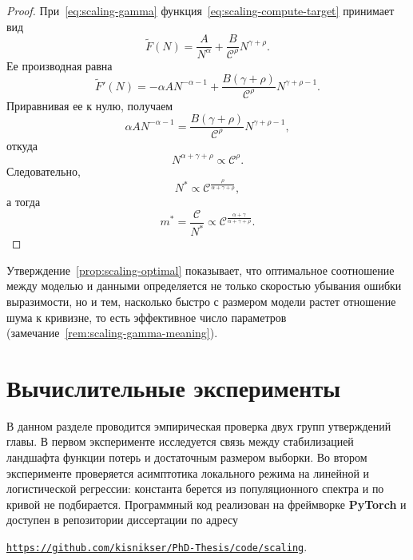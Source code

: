 \begin{proof}
    При~\eqref{eq:scaling-gamma} функция~\eqref{eq:scaling-compute-target} принимает вид
    \begin{equation}
        \widetilde F(N)
        =
        \frac{A}{N^{\alpha}}
        +
        \frac{B}{\mathcal C^{\rho}}N^{\gamma+\rho}.
    \end{equation}
    Ее производная равна
    \begin{equation}
        \widetilde F'(N)
        =
        -\alpha A N^{-\alpha-1}
        +
        \frac{B(\gamma+\rho)}{\mathcal C^{\rho}}N^{\gamma+\rho-1}.
    \end{equation}
    Приравнивая ее к нулю, получаем
    \begin{equation}
        \alpha A N^{-\alpha-1}
        =
        \frac{B(\gamma+\rho)}{\mathcal C^{\rho}}N^{\gamma+\rho-1},
    \end{equation}
    откуда
    \begin{equation}
        N^{\alpha+\gamma+\rho}
        \propto
        \mathcal C^{\rho}.
    \end{equation}
    Следовательно,
    \begin{equation}
        N^*
        \propto
        \mathcal C^{\frac{\rho}{\alpha+\gamma+\rho}},
    \end{equation}
    а тогда
    \begin{equation}
        m^*
        =
        \frac{\mathcal C}{N^*}
        \propto
        \mathcal C^{\frac{\alpha+\gamma}{\alpha+\gamma+\rho}}.
    \end{equation}
\end{proof}

Утверждение~\ref{prop:scaling-optimal} показывает, что оптимальное соотношение между моделью и данными определяется не только скоростью убывания ошибки выразимости, но и тем, насколько быстро с размером модели растет отношение шума к кривизне, то есть эффективное число параметров (замечание~\ref{rem:scaling-gamma-meaning}).

\section{Вычислительные эксперименты}

В данном разделе проводится эмпирическая проверка двух групп утверждений главы. В первом эксперименте исследуется связь между стабилизацией ландшафта функции потерь и достаточным размером выборки. Во втором эксперименте проверяется асимптотика локального режима на линейной и логистической регрессии: константа берется из популяционного спектра и по кривой не подбирается. Программный код реализован на фреймворке \textbf{PyTorch} и доступен в репозитории диссертации по адресу
\begin{center}
    \href{https://github.com/kisnikser/PhD-Thesis/tree/main/code/scaling}{\texttt{https://github.com/kisnikser/PhD-Thesis/code/scaling}}.
\end{center}

